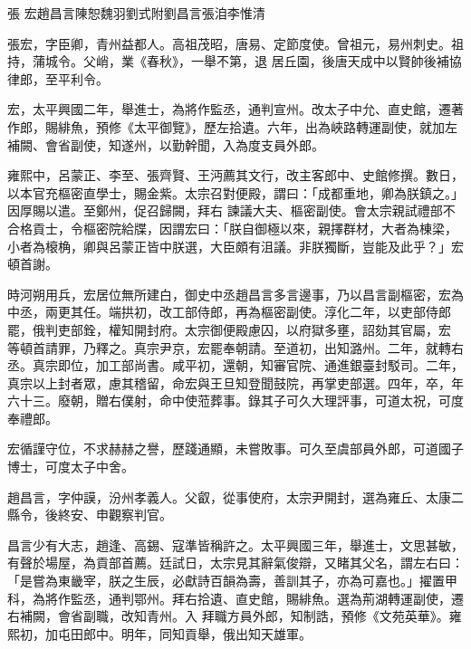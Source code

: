 
\begin{pinyinscope}

 張
 宏趙昌言陳恕魏羽劉式附劉昌言張洎李惟清



 張宏，字臣卿，青州益都人。高祖茂昭，唐易、定節度使。曾祖元，易州刺史。祖持，蒲城令。父峭，業《春秋》，一舉不第，退
 居丘園，後唐天成中以賢帥後補協律郎，至平利令。



 宏，太平興國二年，舉進士，為將作監丞，通判宣州。改太子中允、直史館，遷著作郎，賜緋魚，預修《太平御覽》，歷左拾遺。六年，出為峽路轉運副使，就加左補闕、會省副使，知遂州，以勤幹聞，入為度支員外郎。



 雍熙中，呂蒙正、李至、張齊賢、王沔薦其文行，改主客郎中、史館修撰。數日，以本官充樞密直學士，賜金紫。太宗召對便殿，謂曰：「成都重地，卿為朕鎮之。」因厚賜以遣。至鄭州，促召歸闕，拜右
 諫議大夫、樞密副使。會太宗親試禮部不合格貢士，令樞密院給牒，因謂宏曰：「朕自御極以來，親擇群材，大者為棟梁，小者為榱桷，卿與呂蒙正皆中朕選，大臣頗有沮議。非朕獨斷，豈能及此乎？」宏頓首謝。



 時河朔用兵，宏居位無所建白，御史中丞趙昌言多言邊事，乃以昌言副樞密，宏為中丞，兩更其任。端拱初，改工部侍郎，再為樞密副使。淳化二年，以吏部侍郎罷，俄判吏部銓，權知開封府。太宗御便殿慮囚，以府獄多壅，詔劾其官屬，宏
 等頓首請罪，乃釋之。真宗尹京，宏罷奉朝請。至道初，出知潞州。二年，就轉右丞。真宗即位，加工部尚書。咸平初，還朝，知審官院、通進銀臺封駁司。二年，真宗以上封者眾，慮其稽留，命宏與王旦知登聞鼓院，再掌吏部選。四年，卒，年六十三。廢朝，贈右僕射，命中使蒞葬事。錄其子可久大理評事，可道太祝，可度奉禮郎。



 宏循謹守位，不求赫赫之譽，歷踐通顯，未嘗敗事。可久至虞部員外郎，可道國子博士，可度太子中舍。



 趙昌言，字仲謨，汾州孝義人。父叡，從事使府，太宗尹開封，選為雍丘、太康二縣令，後終安、申觀察判官。



 昌言少有大志，趙逢、高錫、寇準皆稱許之。太平興國三年，舉進士，文思甚敏，有聲於場屋，為貢部首薦。廷試日，太宗見其辭氣俊辯，又睹其父名，謂左右曰：「是嘗為東畿宰，朕之生辰，必獻詩百韻為壽，善訓其子，亦為可嘉也。」擢置甲科，為將作監丞，通判鄂州。拜右拾遺、直史館，賜緋魚。選為荊湖轉運副使，遷右補闕，會省副職，改知青州。入
 拜職方員外郎，知制誥，預修《文苑英華》。雍熙初，加屯田郎中。明年，同知貢舉，俄出知天雄軍。




\end{pinyinscope}
